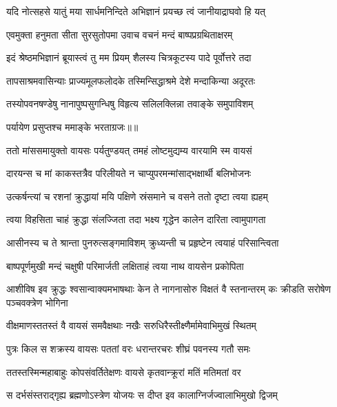 \twolineshloka
{यदि नोत्सहसे यातुं मया सार्धमनिन्दिते}
{अभिज्ञानं प्रयच्छ त्वं जानीयाद्राघवो हि यत्} %

\twolineshloka
{एवमुक्ता हनुमता सीता सुरसुतोपमा}
{उवाच वचनं मन्दं बाष्पप्रग्रथिताक्षरम्} %

\twolineshloka
{इदं श्रेष्ठमभिज्ञानं ब्रूयास्त्वं तु मम प्रियम्}
{शैलस्य चित्रकूटस्य पादे पूर्वोत्तरे तदा} %

\twolineshloka
{तापसाश्रमवासिन्याः प्राज्यमूलफलोदके}
{तस्मिन्सिद्धाश्रमे देशे मन्दाकिन्या अदूरतः} %

\twolineshloka
{तस्योपवनषण्डेषु नानापुष्पसुगन्धिषु}
{विहृत्य सलिलक्लिन्ना तवाङ्के समुपाविशम्} %

{पर्यायेण प्रसुप्तश्च ममाङ्के भरताग्रजः॥॥} %

\addtocounter{shlokacount}{1}

\twolineshloka
{ततो मांससमायुक्तो वायसः पर्यतुण्डयत्}
{तमहं लोष्टमुद्यम्य वारयामि स्म वायसं} %

\twolineshloka
{दारयन्स च मां काकस्तत्रैव परिलीयते}
{न चाप्युपरमन्मांसाद्भक्षार्थी बलिभोजनः} %

\twolineshloka
{उत्कर्षन्त्यां च रशनां क्रुद्धायां मयि पक्षिणे}
{स्रंसमाने च वसने ततो दृष्टा त्वया ह्यहम्} %

\twolineshloka
{त्वया विहसिता चाहं क्रुद्धा संलज्जिता तदा}
{भक्ष्य गृद्धेन कालेन दारिता त्वामुपागता} %

\twolineshloka
{आसीनस्य च ते श्रान्ता पुनरुत्सङ्गमाविशम्}
{क्रुध्यन्ती च प्रहृष्टेन त्वयाहं परिसान्त्विता} %

\twolineshloka
{बाष्पपूर्णमुखी मन्दं चक्षुषी परिमार्जती}
{लक्षिताहं त्वया नाथ वायसेन प्रकोपिता} %

\threelineshloka
{आशीविष इव क्रुद्धः श्वसान्वाक्यमभाषथाः}
{केन ते नागनासोरु विक्षतं वै स्तनान्तरम्}
{कः क्रीडति सरोषेण पञ्चवक्त्रेण भोगिना} %

\twolineshloka
{वीक्षमाणस्ततस्तं वै वायसं समवैक्षथाः}
{नखैः सरुधिरैस्तीक्ष्णैर्मामेवाभिमुखं स्थितम्} %

\twolineshloka
{पुत्रः किल स शक्रस्य वायसः पततां वरः}
{धरान्तरचरः शीघ्रं पवनस्य गतौ समः} %

\twolineshloka
{ततस्तस्मिन्महाबाहुः कोपसंवर्तितेक्षणः}
{वायसे कृतवान्क्रूरां मतिं मतिमतां वर} %

\twolineshloka
{स दर्भसंस्तराद्गृह्य ब्रह्मणोऽस्त्रेण योजयः}
{स दीप्त इव कालाग्निर्जज्वालाभिमुखो द्विजम्} %

